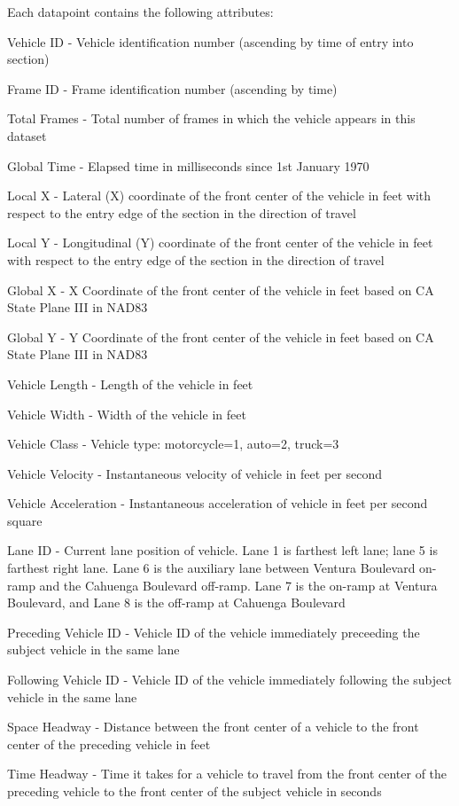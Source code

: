 \documentclass[11pt]{uonthesis}
\begin{document}
Each datapoint contains the following attributes:
\begin{description}
    \item Vehicle ID - Vehicle identification number (ascending by time of entry into section)
    \item Frame ID - Frame identification number (ascending by time)
    \item Total Frames - Total number of frames in which the vehicle appears in this dataset
    \item Global Time - Elapsed time in milliseconds since 1st January 1970
    \item Local X - Lateral (X) coordinate of the front center of the vehicle in feet with respect to the entry edge of the section in the direction of travel
    \item Local Y - Longitudinal (Y) coordinate of the front center of the vehicle in feet with respect to the entry edge of the section in the direction of travel
    \item Global X - X Coordinate of the front center of the vehicle in feet based on CA State Plane III in NAD83
    \item Global Y - Y Coordinate of the front center of the vehicle in feet based on CA State Plane III in NAD83
    \item Vehicle Length - Length of the vehicle in feet
    \item Vehicle Width - Width of the vehicle in feet
    \item Vehicle Class - Vehicle type: motorcycle=1, auto=2, truck=3
    \item Vehicle Velocity - Instantaneous velocity of vehicle in feet per second
    \item Vehicle Acceleration - Instantaneous acceleration of vehicle in feet per second square
    \item Lane ID - Current lane position of vehicle. Lane 1 is farthest left lane; lane 5 is farthest right lane. Lane 6 is the auxiliary lane between Ventura Boulevard on-ramp and the Cahuenga Boulevard off-ramp. Lane 7 is the on-ramp at Ventura Boulevard, and Lane 8 is the off-ramp at Cahuenga Boulevard
    \item Preceding Vehicle ID - Vehicle ID of the vehicle immediately preceeding the subject vehicle in the same lane
    \item Following Vehicle ID - Vehicle ID of the vehicle immediately following the subject vehicle in the same lane
    \item Space Headway - Distance between the front center of a vehicle to the front center of the preceding vehicle in feet
    \item Time Headway - Time it takes for a vehicle to travel from the front center of the preceding vehicle to the front center of the subject vehicle in seconds
\end{description}
\end{document}

